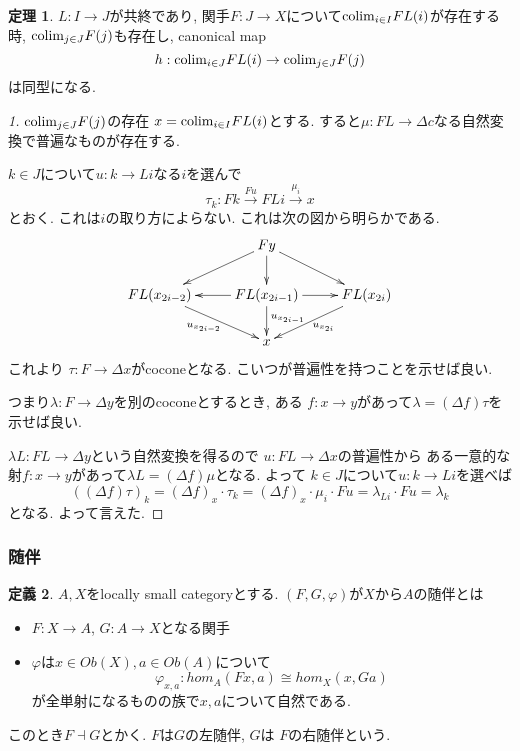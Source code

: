 \documentclass[dvipdfmx,a4paper,11pt]{article}
\newcommand{\colim}{{\rm colim}}
\theoremstyle{definition}
\newtheorem{thm}{定理}
\newtheorem{dfn}[thm]{定義}
\begin{document}
 \begin{tcolorbox}
 [colback = white, colframe = green!35!black, fonttitle = \bfseries,breakable = true]
\begin{thm}
\label{thm-cofinal-commute}
$L : I \to J$が共終であり, 関手$F : J \to X$について$\colim_{i\in I}FL(i)$が存在する時, 
$\colim_{j \in J} F(j)$も存在し, canonical map
$$
h : \colim_{i \in J}FL(i) \to \colim_{j \in J} F(j)
$$
は同型になる. 
\end{thm}
\end{tcolorbox}

\begin{proof}
[1]$\colim_{j \in J} F(j)$の存在
$x= \colim_{i\in I}FL(i)$とする.
すると$\mu : FL \to \Delta c$なる自然変換で普遍なものが存在する.

$k \in J$について$u : k \to Li$なる$i$を選んで
$$
\tau_k : Fk \overset{Fu}{\to} FLi \overset{\mu_{i}}{\to} x
$$
とおく. 
これは$i$の取り方によらない.
これは次の図から明らかである.
\begin{equation*}
\xymatrix@C=25pt@R=20pt{
& Fy\ar@{->}[ld]\ar@{->}[d]\ar@{->}[rd]
&
\\
FL(x_{2i-2})\ar@{->}[rd]_{u_{x_{2i-2}}}
&FL(x_{2i-1})\ar@{->}[l]\ar@{->}[r]\ar@{->}[d]^{u_{x_{2i-1}}}
&FL(x_{2i}) \ar@{->}[ld]^{u_{x_{2i}}}\\   
&x
& \\   
}
\end{equation*}
これより
$\tau : F \to \Delta x$がcoconeとなる.
こいつが普遍性を持つことを示せば良い.

つまり$\lambda : F \to \Delta y$を別のcoconeとするとき, ある
$f : x \to y$があって$\lambda = (\Delta f) \tau$を示せば良い.

$\lambda L : FL \to \Delta y$という自然変換を得るので
$u : FL \to \Delta x$の普遍性から
ある一意的な射$f : x \to y$があって$\lambda L = (\Delta f) \mu $となる.
よって
$k \in J$について$u : k \to Li$を選べば
$$
((\Delta f)\tau)_{k}
= 
(\Delta f)_{x}\cdot \tau_k
=
(\Delta f)_{x} \cdot \mu_{i} \cdot Fu
=\lambda_{Li}\cdot Fu
=\lambda _{k} 
$$
となる. 
よって言えた. 
\end{proof}


\subsubsection{随伴}
 \begin{tcolorbox}
 [colback = white, colframe = green!35!black, fonttitle = \bfseries,breakable = true]
\begin{dfn}
$A,X$をlocally small categoryとする.
$(F,G,\varphi)$が$X$から$A$の随伴とは
\begin{itemize}
\item $F :X \to A$, $G : A \to X$となる関手
\item $\varphi$は$x \in Ob(X), a \in Ob(A)$について
$$
\varphi_{x,a} : hom_{A}(Fx, a) \cong hom_{X}(x, Ga)
$$
が全単射になるものの族で$x,a$について自然である. 
\end{itemize}
このとき$F\dashv G$とかく.
$F$は$G$の左随伴, $G$は $F$の右随伴という. 
\end{dfn}
\end{tcolorbox}
\end{document}
